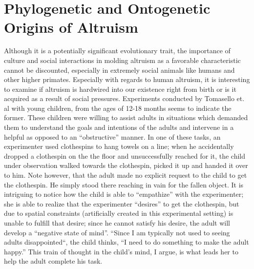 \documentclass[12pt, letter]{article}
\begin{document}
\section*{Phylogenetic and Ontogenetic Origins of Altruism}
Although it is a potentially significant evolutionary trait, the importance of culture and social interactions in molding altruism as a favorable characteristic cannot be discounted, especially in extremely social animals like humans and other higher primates. Especially with regards to human altruism, it is interesting to examine if altruism is hardwired into our existence right from birth or is it acquired as a result of social pressures. Experiments conducted by Tomasello et. al \cite{warneken2009roots} \cite{tomasello2008origins} with young children, from the ages of 12-18 months seems to indicate the former. These children were willing to assist adults in situations which demanded them to understand the goals and intentions of the adults and intervene in a helpful as opposed to an ``obstructive'' manner. In one of these tasks, an experimenter used clothespins to hang towels on a line; when he accidentally dropped a clothespin on the the floor and unsuccessfully reached for it, the child under observation walked towards the clothespin, picked it up and handed it over to him. Note however, that the adult made no explicit request to the child to get the clothespin. He simply stood there reaching in vain for the fallen object. It is intriguing to notice how the child is able to ``empathize'' with the experimenter; she is able to realize that the experimenter ``desires'' to get the clothespin, but due to spatial constraints (artificially created in this experimental setting) is unable to fulfill that desire; since he cannot satisfy his desire, the adult will develop a ``negative state of mind''. ``Since I am typically not used to seeing adults disappointed``, the child thinks, ``I need to do something to make the adult happy.'' This train of thought in the child's mind, I argue, is what leads her to help the adult complete his task. 
\end{document}
